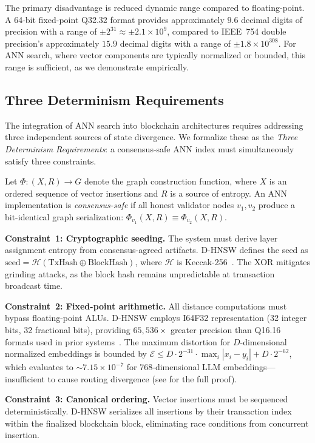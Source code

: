 \documentclass[10pt,journal]{IEEEtran}
\newcommand{\dhnsw}{\textsc{D-HNSW}}
\begin{document}
The primary disadvantage is reduced dynamic range compared to floating-point. A 64-bit fixed-point Q32.32 format provides approximately $9.6$ decimal digits of precision with a range of $\pm 2^{31} \approx \pm 2.1 \times 10^9$, compared to IEEE~754 double precision's approximately $15.9$ decimal digits with a range of $\pm 1.8 \times 10^{308}$. For ANN search, where vector components are typically normalized or bounded, this range is sufficient, as we demonstrate empirically.

\subsection{Three Determinism Requirements}
\label{sec:trilemma}

The integration of ANN search into blockchain architectures requires addressing three independent sources of state divergence. We formalize these as the \emph{Three Determinism Requirements}: a consensus-safe ANN index must simultaneously satisfy three constraints.

Let $\Phi: (X, R) \rightarrow G$ denote the graph construction function, where $X$ is an ordered sequence of vector insertions and $R$ is a source of entropy. An ANN implementation is \emph{consensus-safe} if all honest validator nodes $v_1, v_2$ produce a bit-identical graph serialization: $\Phi_{v_1}(X, R) \equiv \Phi_{v_2}(X, R)$.

\textbf{Constraint~1: Cryptographic seeding.} The system must derive layer assignment entropy from consensus-agreed artifacts. \dhnsw{} defines the seed as $\text{seed} = \mathcal{H}(\text{TxHash} \oplus \text{BlockHash})$, where $\mathcal{H}$ is Keccak-256~\cite{bertoni2013keccak}. The XOR mitigates grinding attacks, as the block hash remains unpredictable at transaction broadcast time.

\textbf{Constraint~2: Fixed-point arithmetic.} All distance computations must bypass floating-point ALUs. \dhnsw{} employs I64F32 representation (32 integer bits, 32 fractional bits), providing $65{,}536\times$ greater precision than Q16.16 formats used in prior systems~\cite{gudur2025valori}. The maximum distortion for $D$-dimensional normalized embeddings is bounded by $\mathcal{E} \leq D \cdot 2^{-31} \cdot \max_i |x_i - y_i| + D \cdot 2^{-62}$, which evaluates to $\sim 7.15 \times 10^{-7}$ for 768-dimensional LLM embeddings---insufficient to cause routing divergence (see  for the full proof).

\textbf{Constraint~3: Canonical ordering.} Vector insertions must be sequenced deterministically. \dhnsw{} serializes all insertions by their transaction index within the finalized blockchain block, eliminating race conditions from concurrent insertion.
\end{document}
